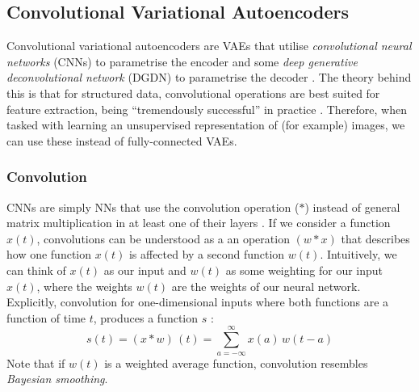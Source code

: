 \subsection{Convolutional Variational Autoencoders}
\label{subsec:2_conv_VAEs}
Convolutional variational autoencoders are VAEs that utilise \textit{convolutional neural networks} (CNNs) to parametrise the encoder and some \textit{deep generative deconvolutional network} (DGDN) to parametrise the decoder \cite{conv_vae}. The theory behind this is that for structured data, convolutional operations are best suited for feature extraction, being ``tremendously successful'' in practice \cite{DeepLearningBook}. Therefore, when tasked with learning an unsupervised representation of (for example) images, we can use these instead of fully-connected VAEs.

\subsubsection{Convolution}
CNNs are simply NNs that use the convolution operation ($*$) instead of general matrix multiplication in at least one of their layers \cite{DeepLearningBook}. If we consider a function $x(t)$, convolutions can be understood as a an operation $(w*x)$ that describes how one function $x(t)$ is affected by a second function $w(t)$. Intuitively, we can think of $x(t)$ as our input and $w(t)$ as some weighting for our input $x(t)$, where the weights $w(t)$ are the weights of our neural network.
Explicitly, convolution for one-dimensional inputs where both functions are a function of time $t$, produces a function $s$ \cite{DeepLearningBook}:
\begin{equation}
    s(t) = (x * w)\,(t) = \sum^\infty_{a=-\infty} x(a)\, w(t-a)
\end{equation}
Note that if $w(t)$ is a weighted average function, convolution resembles \textit{Bayesian smoothing}.

